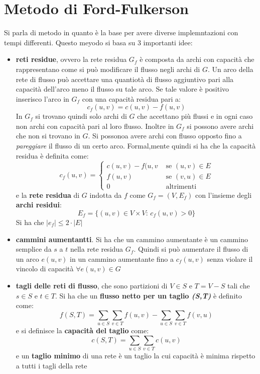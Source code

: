 \documentclass[a4paper,12pt, oneside]{book}
\begin{document}
\section{Metodo di Ford-Fulkerson}
Si parla di metodo in quanto è la base per avere diverse
implemntazioni con tempi differenti. Questo meyodo si basa su 3
importanti idee:
\begin{itemize}
  \item \textbf{reti residue}, ovvero la rete residua $G_f$ è composta
  da archi con capacità che rappresentano come si può modificare il
  flusso negli archi di $G$. Un arco della rete di flusso può
  accettare una quantiotà di flusso aggiuntivo pari  alla capacità
  dell'arco meno il flusso su tale arco. Se tale valore è positivo
  inserisco l'arco in $G_f$ con una capacità residua pari a:
  \[c_f(u,v)=c(u,v)-f(u,v)\]
  In $G_f$ si trovano quindi solo archi di $G$ che accettano più
  flussi e in ogni caso non archi con capacità pari al loro
  flusso. Inoltre in $G_f$ si possono avere archi che non si trovano
  in $G$. Si possonoa avere archi con flusso opposto fino a
  \textit{pareggiare} il flusso di un certo arco. Formal,mente quindi
  si ha che la capacità residua è definita come:
  \[c_f(u,v)=
    \begin{cases}
      c(u,v)-f(u,v & \mbox{ se } (u,v) \in E\\
      f(u,v) & \mbox{ se } (v,u) \in E\\
      0 & \mbox{ altrimenti}
    \end{cases}
  \]
  e la \textbf{rete residua} di $G$ indotta da $f$ come $G_f=(V,E_f)$
  con l'insieme degli \textbf{archi residui}:
  \[E_f=\{(u,v)\in V\times V:\,c_f(u,v)>0\}\]
  Si ha che $|e_f|\leq 2\cdot |E|$
  \item \textbf{cammini aumentantti}. Si ha che un cammino aumentante
  è un cammino semplice da $s$ a $t$ nella rete residua $G_f$. Quindi
  si può aumentare il flusso di un arco $e(u,v)$ in un cammino
  aumentante fino a $c_f(u,v)$ senza violare il vincolo di capacità
  $\forall e(u,v)\in G$ 
  \item \textbf{tagli delle reti di flusso}, che sono partizioni di
  $V\in S$ e $T=V-S$ tali che $s\in S$ e $t\in T$. Si ha che un
  \textbf{flusso netto per un taglio \textit{(S,T)}} è definito come:
  \[f(S,T)=\sum_{u\in S}\sum_{v\in T}f(u,v)-\sum_{u\in S}\sum_{v\in
      T}f(v,u)\]
  e si definisce la \textbf{capacità del taglio} come:
  \[c(S,T)=\sum_{u\in S}\sum_{v\in T}c(u,v)\]
  e un \textbf{taglio minimo} di una rete è un taglio la cui capacità
  è minima rispetto a tutti i tagli della rete
\end{itemize}
\end{document}
